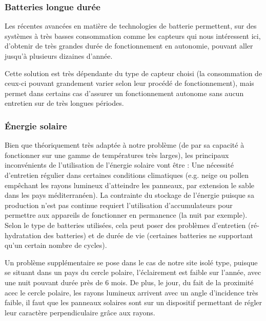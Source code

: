 \subsubsection{Batteries longue durée}

Les récentes avancées en matière de technologies de batterie permettent, sur des systèmes à très basses consommation comme les capteurs qui nous intéressent ici, d’obtenir de très grandes durée de fonctionnement en autonomie, pouvant aller jusqu’à plusieurs dizaines d’année\footnotemark.


Cette solution est très dépendante du type de capteur choisi (la consommation de ceux-ci pouvant grandement varier selon leur procédé de fonctionnement), mais permet dans certains cas d’assurer un fonctionnement autonome sans aucun entretien sur de très longues périodes.

\subsubsection{Énergie solaire}

Bien que théoriquement très adaptée à notre problème (de par sa capacité à fonctionner sur une gamme de températures très larges), les principaux inconvénients de l’utilisation de l’énergie solaire vont être :
Une nécessité d’entretien régulier dans certaines conditions climatiques (e.g. neige ou pollen empêchant les rayons lumineux d’atteindre les panneaux, par extension le sable dans les pays méditerranéen).
La contrainte du stockage de l’énergie puisque sa production n’est pas continue requiert l’utilisation d’accumulateurs pour permettre aux appareils de fonctionner en permanence (la nuit par exemple). Selon le type de batteries utilisées, cela peut poser des problèmes d’entretien (ré-hydratation des batteries) et de durée de vie (certaines batteries ne supportant qu’un certain nombre de cycles).

Un problème supplémentaire se pose dans le cas de notre site isolé type, puisque se situant dans un pays du cercle polaire, l’éclairement est faible sur l'année, avec une nuit pouvant durée près de 6 mois. De plus, le jour, du fait de la proximité acec le cercle polaire, les rayons lumineux arrivent avec un angle d'incidence très faible, il faut que les panneaux solaires sont sur un dispositif permettant de régler leur caractère perpendiculaire grâce aux rayons.

